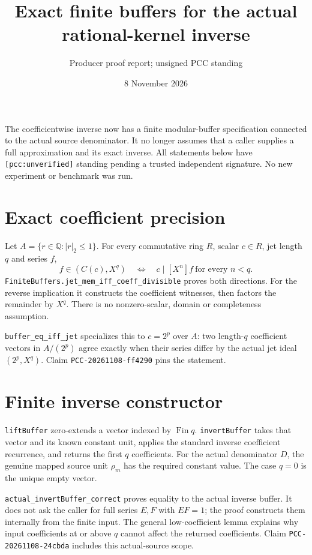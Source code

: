 \documentclass[10pt]{article}
\title{Exact finite buffers for the actual rational-kernel inverse}
\author{Producer proof report; unsigned PCC standing}
\date{8 November 2026}
\begin{document}
\maketitle
The coefficientwise inverse now has a finite modular-buffer specification
connected to the actual source denominator. It no longer assumes that a caller
supplies a full approximation and its exact inverse. All statements below have
\texttt{[pcc:unverified]} standing pending a trusted independent signature.
No new experiment or benchmark was run.

\section*{Exact coefficient precision}
Let $A=\{r\in\mathbb Q:|r|_2\le1\}$. For every commutative ring $R$, scalar
$c\in R$, jet length $q$ and series $f$,
\[f\in(C(c),X^q)\quad\Longleftrightarrow\quad
 c\mid[X^n]f\ \text{for every }n<q.\]
\texttt{FiniteBuffers.jet\_mem\_iff\_coeff\_divisible} proves both directions.
For the reverse implication it constructs the coefficient witnesses, then
factors the remainder by $X^q$. There is no nonzero-scalar, domain or
completeness assumption.

\texttt{buffer\_eq\_iff\_jet} specializes this to $c=2^p$ over $A$:
two length-$q$ coefficient vectors in $A/(2^p)$ agree exactly when their
series differ by the actual jet ideal $(2^p,X^q)$. Claim
\texttt{PCC-20261108-ff4290} pins the statement.

\section*{Finite inverse constructor}
\texttt{liftBuffer} zero-extends a vector indexed by $\operatorname{Fin}q$.
\texttt{invertBuffer} takes that vector and its known constant unit, applies
the standard inverse coefficient recurrence, and returns the first $q$
coefficients. For the actual denominator $D$, the genuine mapped source unit
$\rho_m$ has the required constant value. The case $q=0$ is the unique empty
vector.

\texttt{actual\_invertBuffer\_correct} proves equality to the actual inverse
buffer. It does not ask the caller for full series $E,F$ with $EF=1$; the
proof constructs them internally from the finite input. The general
low-coefficient lemma explains why input coefficients at or above $q$
cannot affect the returned coefficients. Claim
\texttt{PCC-20261108-24cbda} includes this actual-source scope.
\end{document}
